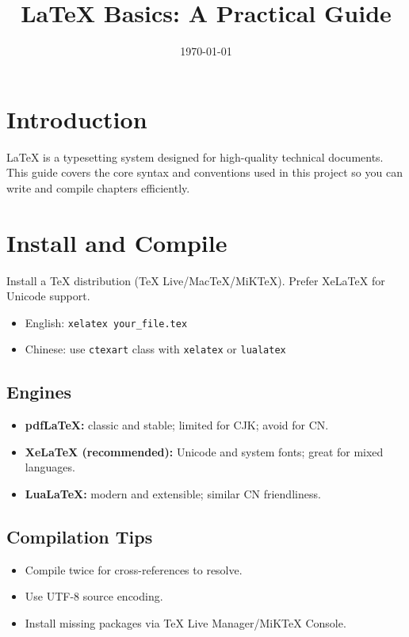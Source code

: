 \documentclass[11pt]{article}
\title{LaTeX Basics: A Practical Guide}
\author{}
\date{\today}
\begin{document}
\maketitle
\tableofcontents
\clearpage

\section{Introduction}
LaTeX is a typesetting system designed for high-quality technical documents. This guide covers the core syntax and conventions used in this project so you can write and compile chapters efficiently.

\section{Install and Compile}
Install a TeX distribution (TeX Live/MacTeX/MiKTeX). Prefer XeLaTeX for Unicode support.
\begin{itemize}
  \item English: \texttt{xelatex your\_file.tex}
  \item Chinese: use \texttt{ctexart} class with \texttt{xelatex} or \texttt{lualatex}
\end{itemize}

\subsection{Engines}
\begin{itemize}
  \item \textbf{pdfLaTeX:} classic and stable; limited for CJK; avoid for CN.
  \item \textbf{XeLaTeX (recommended):} Unicode and system fonts; great for mixed languages.
  \item \textbf{LuaLaTeX:} modern and extensible; similar CN friendliness.
\end{itemize}

\subsection{Compilation Tips}
\begin{itemize}
  \item Compile twice for cross-references to resolve.
  \item Use UTF-8 source encoding.
  \item Install missing packages via TeX Live Manager/MiKTeX Console.
\end{itemize}
\end{document}
